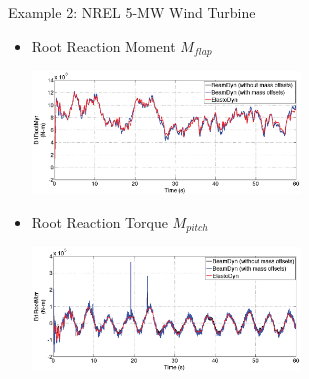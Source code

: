 \documentclass[xcolor=cmyk]{beamer}
\begin{document}
\begin{frame}{Example 2: NREL 5-MW Wind Turbine}
    \begin{itemize}
        \item
        Root Reaction Moment $M_{flap}$
         \begin{center}
         \includegraphics[width=2.8in]{EPSF/B1RootMyr.eps}
         \end{center}
         \item
         Root Reaction Torque $M_{pitch}$
         \begin{center}
         \includegraphics[width=2.8in]{EPSF/B1RootMzr.eps}
         \end{center}
    \end{itemize}
\end{frame}
\end{document}
